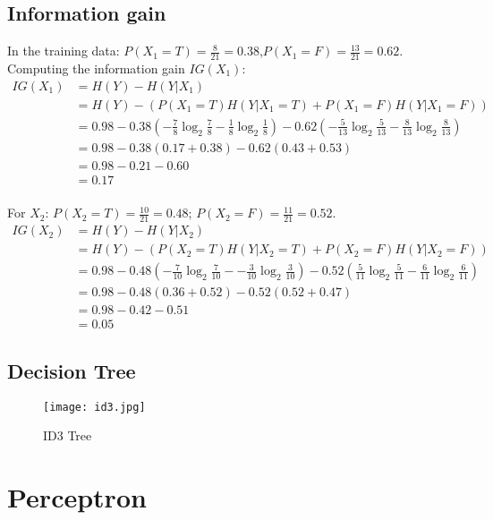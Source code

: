\documentclass{article}
\begin{document}
\subsection{Information gain}
In the training data: $P(X_1=T)=\frac{8}{21}=0.38$,$P(X_1=F)=\frac{13}{21}=0.62$.\\
Computing the information gain $IG(X_1)$:
\begin{align*}
IG(X_1)&=H(Y)-H(Y|X_1)\\
		&=H(Y)-(P(X_1=T)H(Y|X_1=T)+P(X_1=F)H(Y|X_1=F))\\
		&=0.98-0.38({-\frac{7}{8}\log_2 \frac{7}{8}}-{\frac{1}{8}\log_2 \frac{1}{8}})-0.62({-\frac{5}{13}\log_2 \frac{5}{13}}-{\frac{8}{13}\log_2 \frac{8}{13}})\\
		&=0.98-0.38(0.17+0.38)-0.62(0.43+0.53)\\
		&=0.98-0.21-0.60\\
		&=0.17
\end{align*}\\
For $X_2$: $P(X_2=T)=\frac{10}{21}=0.48$; $P(X_2=F)=\frac{11}{21}=0.52$.\\
\begin{align*}
IG(X_2)&=H(Y)-H(Y|X_2)\\
		&=H(Y)-(P(X_2=T)H(Y|X_2=T)+P(X_2=F)H(Y|X_2=F))\\
		&=0.98-0.48({-\frac{7}{10}\log_2 \frac{7}{10}}-{-\frac{3}{10}\log_2 \frac{3}{10}})-0.52({\frac{5}{11}\log_2 \frac{5}{11}}-{\frac{6}{11}\log_2 \frac{6}{11}})\\
		&=0.98-0.48(0.36+0.52)-0.52(0.52+0.47)\\
		&=0.98-0.42-0.51\\
		&=0.05
\end{align*}

\subsection{Decision Tree}
\begin{figure}[H]
\centering
\texttt{[image: id3.jpg]}
\caption{ID3 Tree}
\label{fig3.2.1}
\end{figure}



\section{Perceptron}
\end{document}
